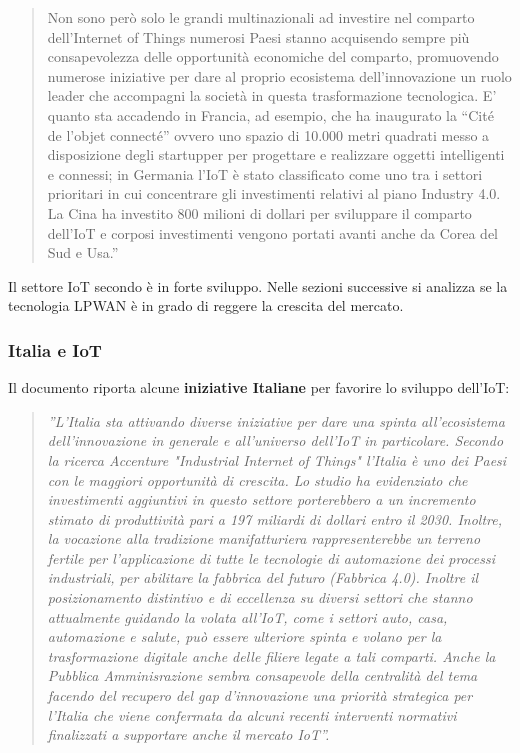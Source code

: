 \documentclass[a4paper]{report} %
\begin{document}
\begin{quote}
{	Non sono però solo le grandi multinazionali ad investire nel comparto dell’Internet of Things numerosi Paesi stanno acquisendo sempre più consapevolezza delle opportunità economiche del comparto, promuovendo numerose iniziative per dare al proprio ecosistema dell’innovazione un ruolo leader che accompagni la società in questa trasformazione tecnologica. E’ quanto sta accadendo in Francia, ad esempio, che ha inaugurato la “Cité de l’objet connecté” ovvero uno spazio di 10.000 metri quadrati messo a disposizione degli startupper per progettare e realizzare oggetti intelligenti e connessi; in Germania l’IoT è stato  classificato come uno tra i settori prioritari in cui concentrare gli investimenti relativi al piano Industry 4.0. La Cina ha investito 800 milioni di dollari per sviluppare il comparto dell’IoT e corposi investimenti vengono portati avanti anche da Corea del Sud e Usa.''} 
\end{quote} 
Il settore IoT secondo \cite{art:rif.22} è in forte sviluppo. Nelle sezioni successive si analizza se la tecnologia LPWAN è in grado di reggere la crescita del mercato.

\subsubsection{Italia e IoT} 
Il documento \cite{art:rif.22} riporta alcune \textbf{iniziative Italiane} per favorire lo sviluppo dell'IoT:
\begin{quote}
	\textit{''L'Italia sta attivando diverse iniziative per dare una spinta all’ecosistema dell’innovazione in generale e all’universo dell’IoT in particolare. Secondo la ricerca Accenture "Industrial Internet of Things" l’Italia è uno dei Paesi con le maggiori opportunità di crescita. Lo studio ha evidenziato che investimenti aggiuntivi in questo settore porterebbero a un incremento stimato di produttività  pari a 197 miliardi di dollari entro il 2030.
	Inoltre, la vocazione alla tradizione manifatturiera rappresenterebbe un terreno fertile per l’applicazione di tutte le tecnologie di automazione dei processi industriali, per abilitare la fabbrica del futuro (Fabbrica 4.0). Inoltre il posizionamento distintivo e di eccellenza su diversi settori che stanno attualmente guidando la volata all’IoT, come i settori auto, casa, automazione e salute, può essere ulteriore spinta e volano per la trasformazione digitale anche delle filiere legate a tali comparti.
	Anche la Pubblica Amminisrazione sembra consapevole della centralità del tema facendo del recupero del gap d’innovazione una priorità strategica per l’Italia che viene confermata da alcuni recenti interventi normativi finalizzati a supportare anche il mercato IoT''.}
\end{quote}
\end{document}

